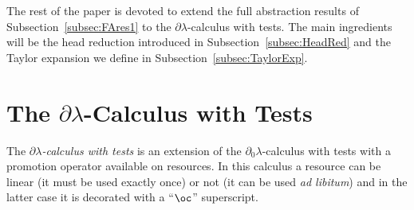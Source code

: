 \documentclass{LMCS}
\newcommand{\dlam}{\ensuremath{\partial\lambda}}
\newcommand{\dzlam}{\ensuremath{\partial_0\lambda}}
\newcommand{\bang}{\oc}
\begin{document}
The rest of the paper is devoted to extend the full abstraction results of Subsection~\ref{subsec:FAres1} to the
\dlam-calculus with tests.
The main ingredients will be the head reduction introduced in Subsection~\ref{subsec:HeadRed} and
the Taylor expansion we define in Subsection~\ref{subsec:TaylorExp}.
 \section{The \dlam-Calculus with Tests}\label{sec:FullRC}

The \emph{\dlam-calculus with tests} is an extension of the 
\dzlam-calculus with tests with a promotion operator available on resources. 
In this calculus a resource can be linear (it must be used exactly once) or not 
(it can be used \emph{ad libitum}) and in the latter case it is decorated with a ``$\bang$'' superscript.
\end{document}
